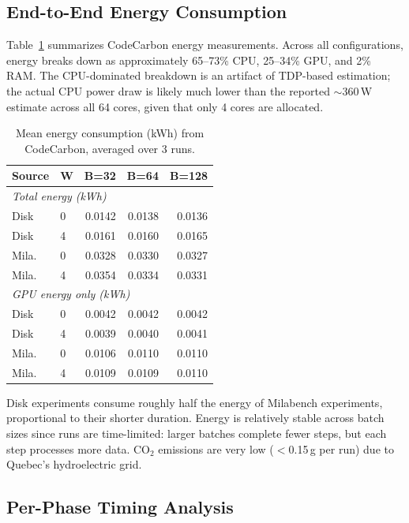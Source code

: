 \documentclass[10pt,twocolumn]{article}
\begin{document}
\subsection{End-to-End Energy Consumption}

Table~\ref{tab:energy} summarizes CodeCarbon energy measurements. Across all configurations, energy breaks down as approximately 65--73\% CPU, 25--34\% GPU, and 2\% RAM. The CPU-dominated breakdown is an artifact of TDP-based estimation; the actual CPU power draw is likely much lower than the reported $\sim$360\,W estimate across all 64 cores, given that only 4 cores are allocated.

\begin{table}[H]
\centering
\caption{Mean energy consumption (kWh) from CodeCarbon, averaged over 3 runs.}
\label{tab:energy}
\small
\begin{tabular}{llrrr}
\toprule
Source & W & B=32 & B=64 & B=128 \\
\midrule
\multicolumn{5}{l}{\textit{Total energy (kWh)}} \\
Disk   & 0 & 0.0142 & 0.0138 & 0.0136 \\
Disk   & 4 & 0.0161 & 0.0160 & 0.0165 \\
Mila.  & 0 & 0.0328 & 0.0330 & 0.0327 \\
Mila.  & 4 & 0.0354 & 0.0334 & 0.0331 \\
\midrule
\multicolumn{5}{l}{\textit{GPU energy only (kWh)}} \\
Disk   & 0 & 0.0042 & 0.0042 & 0.0042 \\
Disk   & 4 & 0.0039 & 0.0040 & 0.0041 \\
Mila.  & 0 & 0.0106 & 0.0110 & 0.0110 \\
Mila.  & 4 & 0.0109 & 0.0109 & 0.0110 \\
\bottomrule
\end{tabular}
\end{table}

Disk experiments consume roughly half the energy of Milabench experiments, proportional to their shorter duration. Energy is relatively stable across batch sizes since runs are time-limited: larger batches complete fewer steps, but each step processes more data. CO$_2$ emissions are very low ($<$0.15\,g per run) due to Quebec's hydroelectric grid.

\subsection{Per-Phase Timing Analysis}
\end{document}
